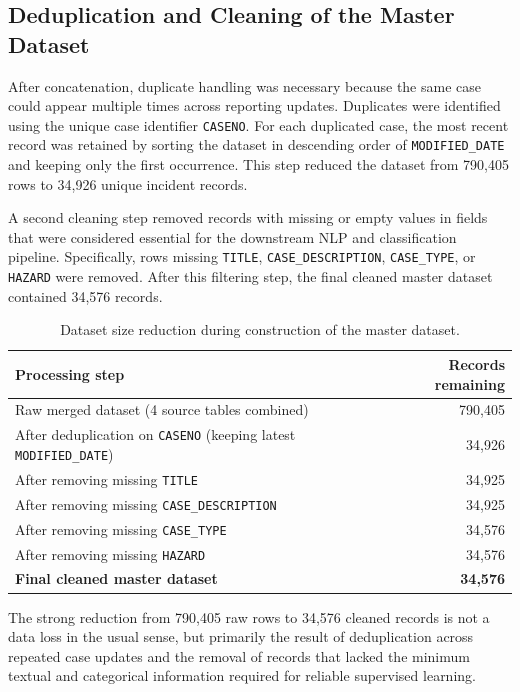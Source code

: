\documentclass[11pt, titlepage, bibliography=totoc]{scrreprt}
\begin{document}
\subsection{Deduplication and Cleaning of the Master Dataset}

After concatenation, duplicate handling was necessary because the same case could appear multiple times across reporting updates. Duplicates were identified using the unique case identifier \texttt{CASENO}. For each duplicated case, the most recent record was retained by sorting the dataset in descending order of \texttt{MODIFIED\_DATE} and keeping only the first occurrence. This step reduced the dataset from 790,405 rows to 34,926 unique incident records.

A second cleaning step removed records with missing or empty values in fields that were considered essential for the downstream NLP and classification pipeline. Specifically, rows missing \texttt{TITLE}, \texttt{CASE\_DESCRIPTION}, \texttt{CASE\_TYPE}, or \texttt{HAZARD} were removed. After this filtering step, the final cleaned master dataset contained 34,576 records.

\begin{table}[h!]
\centering
\caption{Dataset size reduction during construction of the master dataset.}
\label{tab:dataset_reduction}
\begin{tabular}{p{9cm}r}
\toprule
\textbf{Processing step} & \textbf{Records remaining} \\
\midrule
Raw merged dataset (4 source tables combined) & 790,405 \\
After deduplication on \texttt{CASENO} (keeping latest \texttt{MODIFIED\_DATE}) & 34,926 \\
After removing missing \texttt{TITLE} & 34,925 \\
After removing missing \texttt{CASE\_DESCRIPTION} & 34,925 \\
After removing missing \texttt{CASE\_TYPE} & 34,576 \\
After removing missing \texttt{HAZARD} & 34,576 \\
\midrule
\textbf{Final cleaned master dataset} & \textbf{34,576} \\
\bottomrule
\end{tabular}
\end{table}

The strong reduction from 790,405 raw rows to 34,576 cleaned records is not a data loss in the usual sense, but primarily the result of deduplication across repeated case updates and the removal of records that lacked the minimum textual and categorical information required for reliable supervised learning.
\end{document}
